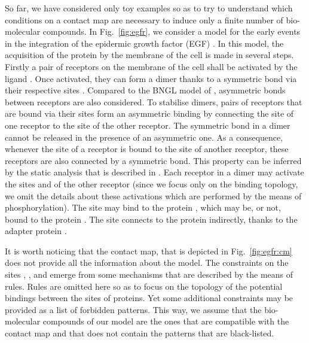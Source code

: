 \documentclass{entcs}
\begin{document}
So far, we have considered only toy examples so as to try to understand which conditions on a contact map are necessary to induce only a finite number of bio-molecular compounds. In Fig.~\ref{fig:egfr}, we consider
a model for the early events in the integration of the epidermic growth factor (EGF) \cite{Blinov-2006-ANM}. In this model, the acquisition of the protein  by the membrane of the cell is made in several steps.
Firstly a pair of receptors  on the membrane of the cell shall be activated by the ligand . Once activated, they can form a dimer thanks to a symmetric bond via their respective sites
. Compared to the BNGL model of \cite{Blinov-2006-ANM}, asymmetric bonds between receptors are also considered. To stabilise dimers, pairs of receptors that are bound via their sites  form an asymmetric binding by connecting the site  of one receptor to the site  of the other receptor. The symmetric bond in a dimer cannot be released in the presence of an asymmetric one. As a consequence, whenever the site  of a receptor is bound to the site  of another receptor, these receptors are also connected by a symmetric bond. This property can be inferred
by the static analysis that is described in \cite{SASB2016,KaSa}.
Each receptor in a dimer may activate the sites  and  of the other receptor (since we focus only on the binding topology, we omit the details about these activations which are performed by the means of phosphorylation). The site  may bind to the protein , which may be, or not, bound to the protein
. The site  connects to the protein  indirectly, thanks to the adapter protein .

It is worth noticing that the contact map, that is depicted in Fig.~\ref{fig:egfr:cm} does not provide all the information about the model.
The constraints on the sites , , and  emerge from some mechanisms that are described by the means of rules.
Rules are omitted here so as to focus on the topology of the potential bindings between the sites of proteins. Yet some additional constraints may be provided as a list of forbidden patterns. This way, we assume that the bio-molecular compounds of our model are the ones that are compatible with the contact map and that does not contain the patterns that are black-listed.
\end{document}
